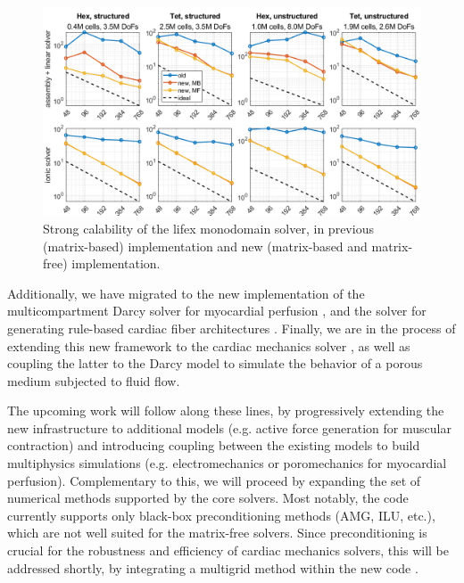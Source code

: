 \documentclass[a4paper,12pt]{article}
\begin{document}
\begin{figure}
  \centering

  \includegraphics[width=\textwidth]{polimi-lifex-scalability-ep.png}

  \caption{Strong calability of the lifex monodomain solver, in previous (matrix-based) implementation and new (matrix-based and matrix-free) implementation.}
  \label{fig:lifex-scalability-ep}
\end{figure}

Additionally, we have migrated to the new implementation of the multicompartment Darcy solver for myocardial perfusion \cite{zingaro2023comprehensive}, and the solver for generating rule-based cardiac fiber architectures \cite{piersanti2021modeling}. Finally, we are in the process of extending this new framework to the cardiac mechanics solver \cite{fedele2023comprehensive}, as well as coupling the latter to the Darcy model to simulate the behavior of a porous medium subjected to fluid flow.

The upcoming work will follow along these lines, by progressively extending the new infrastructure to additional models (e.g. active force generation for muscular contraction) and introducing coupling between the existing models to build multiphysics simulations (e.g. electromechanics or poromechanics for myocardial perfusion). Complementary to this, we will proceed by expanding the set of numerical methods supported by the core solvers. Most notably, the code currently supports only black-box preconditioning methods (AMG, ILU, etc.), which are not well suited for the matrix-free solvers. Since preconditioning is crucial for the robustness and efficiency of cardiac mechanics solvers, this will be addressed shortly, by integrating a multigrid method within the new code \cite{schussnig2025matrixfree}.
\end{document}
